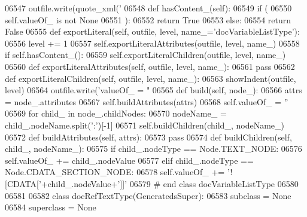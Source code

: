 \begin{DoxyCode}
{{{{{{{{{{{{{{{{{{{{{{{{{{{{{{{{{{{{{{{{{{{{{{{{{{{{{{{{{{{{{{{{{{{{{{{{{{{{{{{{{{{{{{{{{{{{{{{{{{{{{{{{{{{{{{{{{{{{{{{{{{{{{{{{{{{{{{{{{{{{{{{{{{{{{{{{{{{{{{{{{{{{{{{{{{{{{{{{{{{{{{{{{{{{{{{{{{{{{{{{{{{{{{{{{{{{{{{{{{{{{{{{{{{{{{{{{{{{{{{{{{{{{{{{{{{{{{{{{{{{{{{{{{{{{{{{{{{{{{{{{{{{{{{{{{{{{{{{{{{{{{{{{{{{{{{{{{{{{{{{{{{{{{{{{{{{{{{{{{{{{{{{{{{{{{{{{{{{{{{{{{{{{{{{{{{{{{{{{{{{{{{{{{{{{{{{{{{{{{{{{06547             outfile.write(quote_xml(\textcolor{stringliteral}{'%
06548     \textcolor{keyword}{def }hasContent_(self):
06549         \textcolor{keywordflow}{if} (
06550             self.valueOf_ \textcolor{keywordflow}{is} \textcolor{keywordflow}{not} \textcolor{keywordtype}{None}
06551             ):
06552             \textcolor{keywordflow}{return} \textcolor{keyword}{True}
06553         \textcolor{keywordflow}{else}:
06554             \textcolor{keywordflow}{return} \textcolor{keyword}{False}
06555     \textcolor{keyword}{def }exportLiteral(self, outfile, level, name\_='docVariableListType'):
06556         level += 1
06557         self.exportLiteralAttributes(outfile, level, name\_)
06558         \textcolor{keywordflow}{if} self.hasContent_():
06559             self.exportLiteralChildren(outfile, level, name\_)
06560     \textcolor{keyword}{def }exportLiteralAttributes(self, outfile, level, name\_):
06561         \textcolor{keywordflow}{pass}
06562     \textcolor{keyword}{def }exportLiteralChildren(self, outfile, level, name\_):
06563         showIndent(outfile, level)
06564         outfile.write(\textcolor{stringliteral}{'valueOf\_ = "%
06565     \textcolor{keyword}{def }build(self, node\_):
06566         attrs = node\_.attributes
06567         self.buildAttributes(attrs)
06568         self.valueOf_ = \textcolor{stringliteral}{''}
06569         \textcolor{keywordflow}{for} child\_ \textcolor{keywordflow}{in} node\_.childNodes:
06570             nodeName\_ = child\_.nodeName.split(\textcolor{stringliteral}{':'})[-1]
06571             self.buildChildren(child\_, nodeName\_)
06572     \textcolor{keyword}{def }buildAttributes(self, attrs):
06573         \textcolor{keywordflow}{pass}
06574     \textcolor{keyword}{def }buildChildren(self, child\_, nodeName\_):
06575         \textcolor{keywordflow}{if} child\_.nodeType == Node.TEXT\_NODE:
06576             self.valueOf\_ += child\_.nodeValue
06577         \textcolor{keywordflow}{elif} child\_.nodeType == Node.CDATA\_SECTION\_NODE:
06578             self.valueOf\_ += \textcolor{stringliteral}{'![CDATA['}+child\_.nodeValue+\textcolor{stringliteral}{']]'}
06579 \textcolor{comment}{# end class docVariableListType}
06580 
06581 
06582 \textcolor{keyword}{class }docRefTextType(GeneratedsSuper):
06583     subclass = \textcolor{keywordtype}{None}
06584     superclass = \textcolor{keywordtype}{None}
}}}}}}}}}}}}}}}}}}}}}}}}}}}}}}}}}}}}}}}}}}}}}}}}}}}}}}}}}}}}}}}}}}}}}}}}}}}}}}}}}}}}}}}}}}}}}}}}}}}}}}}}}}}}}}}}}}}}}}}}}}}}}}}}}}}}}}}}}}}}}}}}}}}}}}}}}}}}}}}}}}}}}}}}}}}}}}}}}}}}}}}}}}}}}}}}}}}}}}}}}}}}}}}}}}}}}}}}}}}}}}}}}}}}}}}}}}}}}}}}}}}}}}}}}}}}}}}}}}}}}}}}}}}}}}}}}}}}}}}}}}}}}}}}}}}}}}}}}}}}}}}}}}}}}}}}}}}}}}}}}}}}}}}}}}}}}}}}}}}}}}}}}}}}}}}}}}}}}}}}}}}}}}}}}}}}}}}}}}}}}}}}}}}}}}}}}}}}}}}}}}}
\end{DoxyCode}
